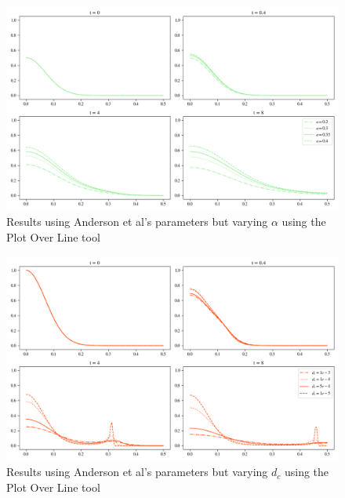 \begin{figure}[h]
    \centering
    \includegraphics[width=\textwidth]{resources/images/alpha_comparison.png}
    \caption{Results using Anderson et al's parameters but varying $\alpha$ using the Plot Over Line tool}
    \label{fig:replication_alpha_comparison}
\end{figure}

\begin{figure}[h]
    \centering
    \includegraphics[width=\textwidth]{resources/images/dc_comparison.png}
    \caption{Results using Anderson et al's parameters but varying $d_c$ using the Plot Over Line tool}
    \label{fig:replication_dc_comparison}
\end{figure}

